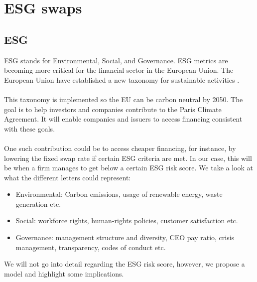 \chapter{ESG swaps}
\label{chp_ESG_swaps}


\section{ESG}
ESG  stands for Environmental, Social, and Governance. ESG metrics are becoming more critical for the financial sector in the European Union. The European Union have established a new taxonomy  for sustainable activities \cite{EU:2021}. 
\\~\\
This taxonomy is implemented so the EU can be carbon neutral by 2050. The goal is to help investors and companies contribute to the Paris Climate Agreement. It will enable companies and issuers to access financing consistent with these goals.
\\~\\ 
One such contribution could be to access cheaper financing, for instance, by lowering the fixed swap rate if certain ESG criteria are met. In our case, this will be when a firm manages to get below a certain ESG risk score. We take a look at what the different letters could represent:

\begin{itemize}
    \item Environmental: Carbon emissions, usage of renewable energy, waste generation etc. 
    \item Social: workforce rights, human-rights policies, customer satisfaction etc. 
    \item Governance: management structure and diversity, CEO pay ratio, crisis management, transparency,  codes of conduct etc. 
\end{itemize}

We will not go into detail regarding the ESG risk score, however, we propose a model and highlight some implications. 

\newpage 


